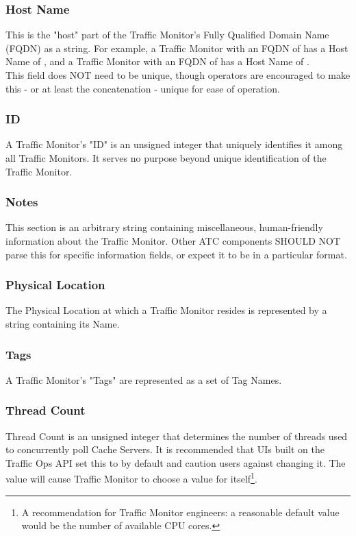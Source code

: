 \subsubsection{Host Name}
This is the "host" part of the Traffic Monitor's Fully Qualified Domain Name
(FQDN) as a string. For example, a Traffic Monitor with an FQDN of
 has a Host Name of , and a Traffic Monitor with an
FQDN of  has a Host Name of
.\\
This field does NOT need to be unique, though operators are encouraged to make
this - or at least the concatenation  - unique
for ease of operation.

\subsubsection{ID}
A Traffic Monitor's "ID" is an unsigned integer that uniquely identifies it
among all Traffic Monitors. It serves no purpose beyond unique identification of
the Traffic Monitor.

\subsubsection{Notes}
This section is an arbitrary string containing miscellaneous, human-friendly
information about the Traffic Monitor. Other ATC components SHOULD NOT parse
this for specific information fields, or expect it to be in a particular
format.

\subsubsection{Physical Location}
The Physical Location at which a Traffic Monitor resides is represented by a
string containing its Name.

\subsubsection{Tags}
A Traffic Monitor's "Tags" are represented as a set of Tag Names.

\subsubsection{Thread Count}
Thread Count is an unsigned integer that determines the number of threads used
to concurrently poll Cache Servers. It is recommended that UIs built on the
Traffic Ops API set this to  by default and caution users against
changing it. The value  will cause Traffic Monitor to choose a value
for itself\footnote{A recommendation for Traffic Monitor engineers: a
reasonable default value would be the number of available CPU cores.}.

